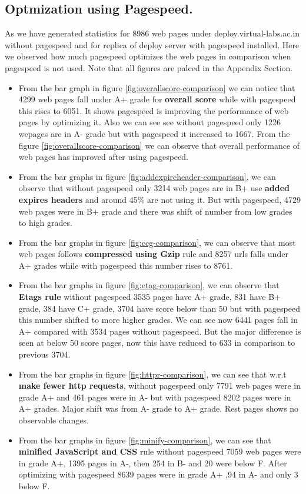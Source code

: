 \documentclass[conference]{IEEEtran}
\begin{document}
\subsection{Optmization using Pagespeed.}\label{sec-6.2}
As we have generated statistics for 8986 web pages under
deploy.virtual-labs.ac.in without pagespeed and for replica of deploy server with pagespeed
installed. Here we observed how much pagespeed optimizes the web pages in comparison
when pagespeed is not used. Note that all figures are palced in the Appendix Section.
\begin{itemize}
\item From the bar graph in figure \ref{fig:overallscore-comparison} we can notice that 4299 web pages fall under
A+ grade for \textbf{overall score} while with pagespeed this rises to 6051. It
shows pagespeed is improving the performance of web pages by optimizing it. Also
we can see see without pagespeed only 1226 wepages are in A- grade but with
pagespeed it increased to 1667. From the figure \ref{fig:overallscore-comparison} we can observe that overall
performance of web pages has improved after using pagespeed.

\item From the bar graphs in figure \ref{fig:addexpireheader-comparison}, we can observe that without pagespeed only 3214
web pages are in B+  use \textbf{added expires headers} and around
45\% are not using it. But with pagespeed, 4729 web pages were in B+ grade and
there was shift of number from low grades to high grades.

\item From the bar graphs in figure \ref{fig:ccg-comparison}, we can observe that most web pages follows \textbf{compressed
using Gzip} rule and 8257 urls falls under A+ grades while with pagespeed this number rises to 8761.

\item From the bar graphs in figure \ref{fig:etag-comparison},
we can observe that \textbf{Etags rule} without pagespeed
3535 pages have A+ grade, 831 have B+ grade, 384 have C+ grade, 3704 have score
below than 50 but with pagespeed this number shifted to more higher grades. We can
see now 6441 pages fall in  A+ compared with 3534 pages without pagespeed. But the major difference is seen
at below 50 score pages, now this have reduced to 633 in comparison to previous
3704.

\item From the bar graphs in figure \ref{fig:httpr-comparison}, we can see that w.r.t \textbf{make fewer http
requests}, without pagespeed only 7791 web pages were in grade A+ and 461 pages
were in A- but with pagespeed 8202 pages were in A+ grades. Major shift was from 
A- grade to A+ grade. Rest pages shows no observable changes.

\item From the bar graphs in figure \ref{fig:minify-comparison}, we can see that \textbf{minified JavaScript and CSS} rule
without pagespeed 7059 web pages were in grade A+, 1395 pages in A-, then 254 in
B- and 20 were below F. After optimizing with pagespeed 8639 pages were in grade A+ ,94 in A- and only 3 below F.
\end{itemize}
\end{document}
